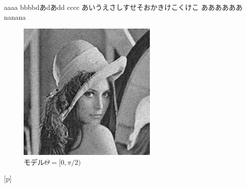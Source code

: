 \documentclass[a4]{ltjsbook}
\begin{document}
aaaa
bbbbdあdあdd
cccc
あいうえさしすせそおかきけこくけこ
ああああああnanana
\begin{figure}[b]
	\centering
    \includegraphics[width=\linewidth]{ista_IM}
    \caption{モデル$\Theta = [0,\pi/2)$}
    \label{fig:srexct}
\end{figure}[p]
\end{document}
